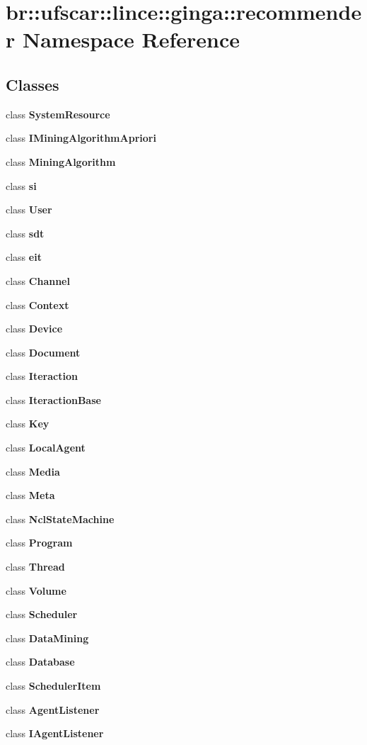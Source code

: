 \section{br::ufscar::lince::ginga::recommender Namespace Reference}
\label{namespacebr_1_1ufscar_1_1lince_1_1ginga_1_1recommender}


\subsection*{Classes}
\begin{CompactItemize}
\item 
class {\bf SystemResource}
\item 
class {\bf IMiningAlgorithmApriori}
\item 
class {\bf MiningAlgorithm}
\item 
class {\bf si}
\item 
class {\bf User}
\item 
class {\bf sdt}
\item 
class {\bf eit}
\item 
class {\bf Channel}
\item 
class {\bf Context}
\item 
class {\bf Device}
\item 
class {\bf Document}
\item 
class {\bf Iteraction}
\item 
class {\bf IteractionBase}
\item 
class {\bf Key}
\item 
class {\bf LocalAgent}
\item 
class {\bf Media}
\item 
class {\bf Meta}
\item 
class {\bf NclStateMachine}
\item 
class {\bf Program}
\item 
class {\bf Thread}
\item 
class {\bf Volume}
\item 
class {\bf Scheduler}
\item 
class {\bf DataMining}
\item 
class {\bf Database}
\item 
class {\bf SchedulerItem}
\item 
class {\bf AgentListener}
\item 
class {\bf IAgentListener}
\end{CompactItemize}

